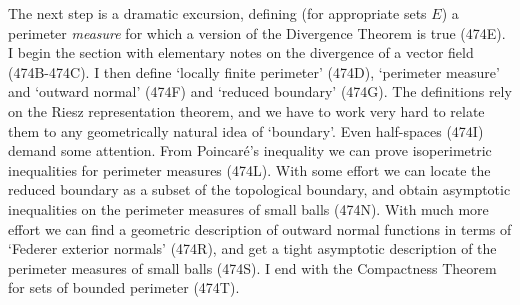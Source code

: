 
\def\varinnerprod#1#2{#1\dotproduct#2}

\def\chaptername{Geometric measure theory}
\def\sectionname{The distributional perimeter}


The next step is a dramatic excursion, defining (for appropriate sets
$E$) a perimeter {\it measure} for which a version of the Divergence
Theorem is true (474E).   I begin the section with elementary notes on
the divergence of a vector field
(474B-474C).   I then define `locally finite perimeter' (474D),
`perimeter measure' and `outward normal' (474F) and `reduced boundary'
(474G).   The definitions rely on the Riesz representation theorem, and
we have to work very hard to relate them to any geometrically natural
idea of `boundary'.   Even half-spaces (474I) demand some attention.
From Poincar\'e's inequality we can prove isoperimetric
inequalities for perimeter measures (474L).   With some effort we can
locate the reduced boundary as a subset of the topological
boundary, and obtain asymptotic inequalities on the
perimeter measures of small balls (474N).   With much more effort we can
find a geometric description of outward normal functions in terms of
`Federer exterior normals' (474R), and get a tight asymptotic
description of the perimeter measures of small balls (474S).   I end
with the Compactness Theorem for sets of bounded perimeter (474T).



